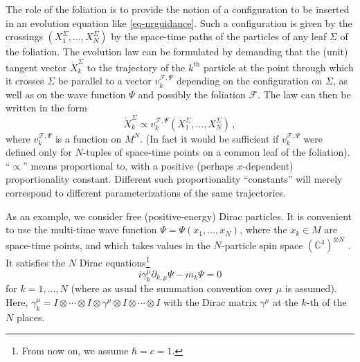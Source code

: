 \documentclass[12pt]{article}
\begin{document}
The role of the foliation is to provide the notion of a configuration
to be inserted in an evolution equation like
\eqref{eq-nrguidance}. Such a configuration is given by the crossings
$(X_1^\Sigma, ... , X_N^\Sigma)$ by the space-time paths of the
particles of any leaf $\Sigma$ of the foliation. The evolution law can
be formulated by demanding that the (unit) tangent vector ${\dot
  X}_k^\Sigma$ to the trajectory of the $k^{\textrm{th}}$ particle at
the point through which it crosses $\Sigma$ be parallel to a vector
$v^{\mathscr{F}, \Psi{}}_k$ depending on the configuration on
$\Sigma$, as well as on the wave function $\Psi$ and possibly the
foliation ${\mathscr{F}}$. The law can then be written in the form
\begin{equation} 
{\dot X}_k^\Sigma \propto  v^{\mathscr{F}, \Psi{}}_k (X_1^\Sigma, ... , X_N^\Sigma)\,,
\label{particleguidance}
\end{equation}
where $v^{\mathscr{F}, \Psi}_k$ is a function on $M^N$. (In fact it would be sufficient if $v^{\mathscr{F}, \Psi{}}_k$ were defined only for $N$-tuples of space-time points on a common leaf of the foliation). ``$\propto$'' means proportional to, with a positive (perhaps $x$-dependent) proportionality constant. Different such proportionality ``constants'' will merely correspond to different parameterizations of the same trajectories. 

As an example, we consider free (positive-energy) Dirac particles.  It is convenient to use the multi-time wave function $\Psi = \Psi(x_1, ..., x_N)$, where the $x_k \in M$ are space-time points, and which takes values in the $N$-particle spin space $({\mathbb C}^4)^{\otimes N}$ \cite{duerr99}. It satisfies the $N$ Dirac equations{\footnote{From now on, we assume $\hbar=c=1$.}}
\begin{equation}
i  \gamma^\mu_k \partial_{k,\mu} \Psi  -  m_k \Psi = 0
\label{multitimedirac}
\end{equation}
for $k = 1, ..., N$ (where as usual the summation convention over $\mu$ is assumed).  Here, $\gamma^\mu_k = I \otimes \cdots \otimes I \otimes \gamma^\mu \otimes I \otimes \cdots \otimes I$ with the Dirac matrix $\gamma^\mu$ at the $k$-th of the $N$ places. 
\end{document}
